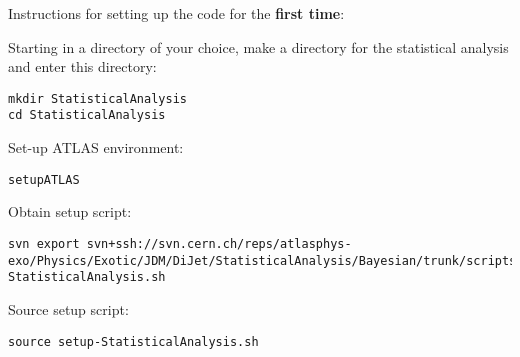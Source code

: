 \documentclass[UKenglish]{latex/atlasdoc}
\begin{document}
\begin{description}

\item Instructions for setting up the code for the \textbf{ first time}:\\

  \item[Step 1] Starting in a directory of your choice, make a directory for the statistical analysis and enter this directory:
\begin{lstlisting}[breaklines]
mkdir StatisticalAnalysis
cd StatisticalAnalysis
\end{lstlisting}

  \item[Step 2] Set-up ATLAS environment:
\begin{lstlisting}[breaklines]
setupATLAS
\end{lstlisting}

  \item[Step 3]  Obtain setup script:
\begin{lstlisting}[breaklines]
svn export svn+ssh://svn.cern.ch/reps/atlasphys-exo/Physics/Exotic/JDM/DiJet/StatisticalAnalysis/Bayesian/trunk/scripts/setup-StatisticalAnalysis.sh
\end{lstlisting}

  \item[Step 4]  Source setup script:
\begin{lstlisting}[breaklines]
source setup-StatisticalAnalysis.sh
\end{lstlisting}





\end{description}
\end{document}
